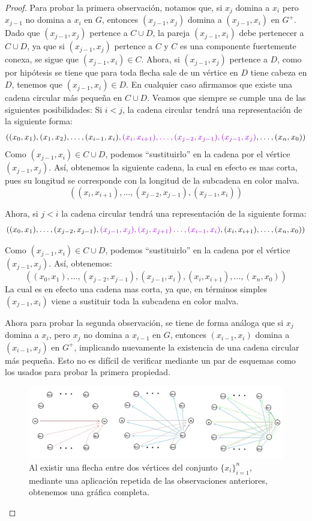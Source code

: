 \begin{proof}
Para probar la primera observaci\'on, notamos que, si $x_j$ domina a $x_i$ pero
$x_{j-1}$ no domina a $x_i$ en $G$, entonces $(x_{j-1},x_j)$ domina a
$(x_{j-1},x_i)$ en $G^+$. Dado que $(x_{j-1},x_j)$ pertence a $C\cup D$, la
pareja $(x_{j-1},x_i) $ debe pertenecer a $C\cup D$, ya que si $(x_{j-1},x_j)$
pertence a $C$ y $C$ es una componente fuertemente conexa, se sigue que
$(x_{j-1},x_i)\in C$. Ahora, si $(x_{j-1},x_j)$ pertence a $D$, como por
hip\'otesis se tiene que para toda flecha sale de un v\'ertice en $D$ tiene
cabeza en $D$, tenemos que $(x_{j-1},x_i)\in D$. En cualquier caso afirmamos que
existe una cadena circular m\'as pequeña en $C \cup D$. Veamos que siempre se
cumple una de las siguientes posibilidades: Si $i<j$, la cadena circular
tendr\'a una representaci\'on de la siguiente forma:
\[
  ( (x_0,x_1),(x_1,x_2),\dots, (x_{i-1},x_i), {\color{malva}(x_i,x_{i+1}),\dots,
  (x_{j-2},x_{j-1}),(x_{j-1},x_{j})}, \dots , (x_n,x_0))
\]
Como $(x_{j-1},x_i) \in C\cup D$, podemos ``sustituirlo'' en la cadena por el
v\'ertice $(x_{j-1},x_{j})$. Así, obtenemos la siguiente cadena, la cual en
efecto es mas corta, pues su longitud se corresponde con la longitud de la
subcadena en color malva.
\[
  ((x_i,x_{i+1}),\dots, (x_{j-2},x_{j-1}),(x_{j-1},x_i))
\]

Ahora, si $j<i$ la cadena circular tendr\'a una representaci\'on de la siguiente
forma:
$$( (x_0,x_1),\dots, (x_{j-2},x_{j-1}),
{\color{malva}(x_{j-1},x_j),(x_j,x_{j+1}) \dots,
(x_{i-1},x_{i})},(x_{i},x_{i+1}), \dots , (x_n,x_0))$$

Como $(x_{j-1},x_i) \in C \cup D$, podemos ``sustituirlo'' en la cadena por el
v\'ertice $(x_{j-1},x_{j})$. Así, obtenemos:
$$( (x_0,x_1),\dots, (x_{j-2},x_{j-1}), (x_{j-1},x_i),(x_{i},x_{i+1}), \dots ,
(x_n,x_0))$$ La cual es en efecto una cadena mas corta, ya que, en t\'erminos
simples $(x_{j-1},x_i)$ viene a sustituir toda la subcadena en color malva.

Ahora para probar la segunda observaci\'on, se tiene de forma an\'aloga que si
$x_j$ domina a $x_i$, pero $x_j$ no domina a $x_{i-1}$ en $G$, entonces
$(x_{i-1}, x_i)$ domina a $(x_{i-1}, x_j)$ en $G^+$, implicando nuevamente la
existencia de una cadena circular m\'as pequeña. Esto no es dif\'icil de
verificar mediante un par de esquemas como los usados para probar la primera
propiedad.

\begin{figure}[H]
  \centering
  \includegraphics[width=1\textwidth]{recursos/capturas/CompeteGraph.jpg}
  \caption{Al existir una flecha entre dos v\'ertices del conjunto $\{x_i
  \}_{i=1}^n$, mediante una aplicaci\'on repetida de las observaciones anteriores,
  obtenemos una gr\'afica completa. }
  \label{fig:completeGraph}
\end{figure}


\end{proof}
